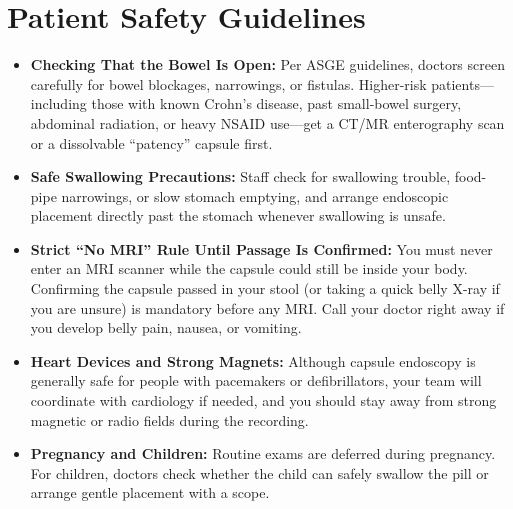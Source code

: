 \section{Patient Safety Guidelines}
\begin{itemize}
    \item \textbf{Checking That the Bowel Is Open:} Per ASGE guidelines, doctors screen carefully for bowel blockages, narrowings, or fistulas. Higher-risk patients---including those with known Crohn's disease, past small-bowel surgery, abdominal radiation, or heavy NSAID use---get a CT/MR enterography scan or a dissolvable ``patency'' capsule first.
    \item \textbf{Safe Swallowing Precautions:} Staff check for swallowing trouble, food-pipe narrowings, or slow stomach emptying, and arrange endoscopic placement directly past the stomach whenever swallowing is unsafe.
    \item \textbf{Strict ``No MRI'' Rule Until Passage Is Confirmed:} You must never enter an MRI scanner while the capsule could still be inside your body. Confirming the capsule passed in your stool (or taking a quick belly X-ray if you are unsure) is mandatory before any MRI. Call your doctor right away if you develop belly pain, nausea, or vomiting.
    \item \textbf{Heart Devices and Strong Magnets:} Although capsule endoscopy is generally safe for people with pacemakers or defibrillators, your team will coordinate with cardiology if needed, and you should stay away from strong magnetic or radio fields during the recording.
    \item \textbf{Pregnancy and Children:} Routine exams are deferred during pregnancy. For children, doctors check whether the child can safely swallow the pill or arrange gentle placement with a scope.
\end{itemize}

